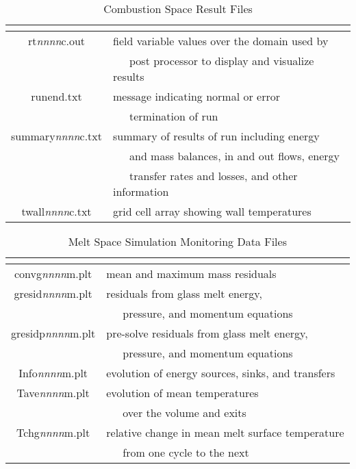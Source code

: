 \documentclass[twoside,12pt]{article}
\newcommand{\var}[1]{\text{\it #1}}
\numberwithin{equation}{section}
\begin{document}
\begin{table}[!hbp]
\caption{Combustion Space Result Files}
\label{result-files-comb}
\centering
\begin{tabular}{|c|l|}
\hline
\var{File Name} & \multicolumn{1}{|c|}{ \var{Explanation}} \\
\hline
rt\textit{nnnn}c.out  & field variable values over the domain used by \\
                      & ~~~post processor to display and visualize results \\
runend.txt  & message indicating normal or error \\
                      & ~~~termination of run \\
summary\textit{nnnn}c.txt  & summary of results of run including energy \\
                      & ~~~and mass balances, in and out flows, energy \\
                      & ~~~transfer rates and losses, and other information \\
twall\textit{nnnn}c.txt  & grid cell array showing wall temperatures \\
\hline
\end{tabular}
\end{table}

\begin{table}[!hbp]
\caption{Melt Space Simulation Monitoring Data Files}
\label{plt-files-melt}
\centering
\begin{tabular}{|c|l|}
\hline
\var{File Name} & \multicolumn{1}{|c|}{ \var{Explanation}} \\
\hline
convg\textit{nnnn}m.plt  & mean and maximum mass residuals \\
gresid\textit{nnnn}m.plt  & residuals from glass melt energy, \\
                          & ~~~pressure, and momentum equations \\
gresidp\textit{nnnn}m.plt  & pre-solve residuals from glass melt energy, \\
                          & ~~~pressure, and momentum equations \\
Info\textit{nnnn}m.plt  & evolution of energy sources, sinks, and transfers \\
Tave\textit{nnnn}m.plt  & evolution of mean temperatures \\
                        & ~~~over the volume and exits \\
Tchg\textit{nnnn}m.plt  & relative change in mean melt surface temperature \\
                        & ~~~from one cycle to the next \\
\hline
\end{tabular}
\end{table}
\end{document}
